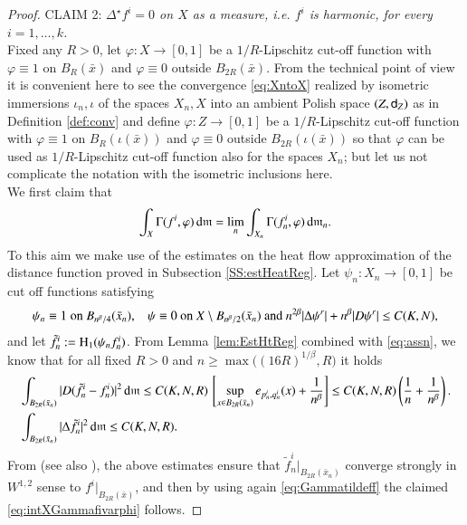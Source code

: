 \documentclass[11pt,reqno]{amsart}
\newcommand{\mm}{\mathfrak m}
\newcommand{\sfd}{{\sf d}}
\renewcommand{\H}{{\rm H}}
\renewcommand{\d}{{\rm{d}}}
\theoremstyle{definition}
\theoremstyle{remark}
\theoremstyle{remark}
\theoremstyle{remark}
\theoremstyle{remark}
\theoremstyle{remark}
\theoremstyle{remark}
\theoremstyle{remark}
\begin{document}
\begin{proof}
CLAIM 2: \emph{ $\Delta^\star f^i = 0$ on $X$ as a measure, i.e. $f^i$ is harmonic, for every $i=1,\ldots,k$.}
\\Fixed any $R>0$, let  $\varphi:X \to [0,1]$ be a $1/R$-Lipschitz cut-off function with $\varphi\equiv 1$ on $B_R(\bar{x})$ and $\varphi\equiv 0$ outside $B_{2R}(\bar{x})$.  From the technical point of view it is convenient here to see the convergence \eqref{eq:XntoX} realized by isometric immersions $\iota_n,\iota$ of the spaces $X_n,X$  into an ambient Polish space $(Z,\sfd_Z)$ as in Definition \ref{def:conv} and define $\varphi:Z \to [0,1]$ be a $1/R$-Lipschitz cut-off function with $\varphi\equiv 1$ on $B_R(\iota(\bar{x}))$  and $\varphi\equiv 0$ outside $B_{2R}(\iota(\bar{x}))$ so that $\varphi$ can be used as  $1/R$-Lipschitz cut-off function also for the spaces $X_n$; but let us not complicate the notation with the isometric inclusions here. 
\\%
We first claim that 
\begin{equation}\label{eq:intXGammafivarphi}
\int_X \Gamma(f^i,\varphi)\, \d\mm= \lim_n \int_{X_n} \Gamma(f^i_n,\varphi)\, \d\mm_n .
\end{equation}
To this aim we make use of the estimates on the heat flow approximation of the distance function proved in Subsection \ref{SS:estHeatReg}. Let $\psi_{n}:X_{n}\to [0,1]$ be   cut off functions satisfying 
$$\psi_{n}\equiv 1 \; \text{on $B_{n^{\beta}/4}(\bar{x}_{n})$, \; } \;   \psi\equiv 0 \text{ on $X\setminus B_{n^{\beta}/2}(\bar{x}_{n})$  and } n^{2\beta}|\Delta \psi^r|+n^{\beta} |D \psi^r| \leq C(K,N), $$
and let $\tilde{f}^{i}_{n}:=\H_{1}(\psi_{n} f^{i}_{n})$. From Lemma \ref{lem:EstHtReg} combined with \eqref{eq:assn}, we know that for all fixed $R>0$ and $n\geq \max\big((16R)^{1/\beta}, R\big)$ it holds
\begin{align}
&\int_{B_{2R}(\bar{x}_{n})} |D(\tilde{f}^{i}_{n}-{f}^{i}_{n})|^{2} \, \d\mm \leq C(K,N,R) \, \left[ \sup_{x \in B_{2 R}(\bar{x}_{n})} e_{p^i_n,q^i_n}(x) +  \frac{1}{n^{\beta}} \right] \leq C(K,N,R) \left(\frac{1}{n}+\frac{1}{n^{\beta}}\right)  . \label{eq:Gammatildeff} \\
&\int_{B_{2R}(\bar{x}_{n})}  |\Delta \tilde{f}^{i}_{n}|^{2} \, \d \mm  \leq C(K,N,R). \nonumber
\end{align}
From \cite[Corollary 5.5]{AH-N} (see also \cite[Corollary 6.10]{GMS2013}), the above estimates ensure that  $\tilde{f}^{i}_{n}|_{B_{2R}(\bar{x}_{n})}$ converge strongly in $W^{1,2}$ sense to $f^{i}|_{B_{2R}(\bar{x})}$, and then by using  again \eqref{eq:Gammatildeff} the claimed  \eqref{eq:intXGammafivarphi} follows.

\end{proof}
\end{document}
